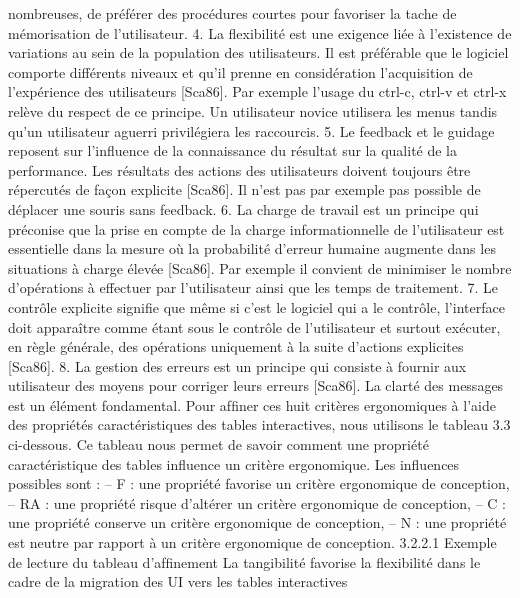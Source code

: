 \documentclass{article}
\begin{document}
nombreuses, de pr\'{e}f\'{e}rer des proc\'{e}dures courtes pour favoriser la tache de m\'{e}morisation de
l’utilisateur.
4. La ﬂexibilit\'{e} est une exigence li\'{e}e \`{a} l’existence de variations au sein de la population des utilisateurs. Il est pr\'{e}f\'{e}rable que le logiciel comporte diff\'{e}rents niveaux et qu’il prenne en consid\'{e}ration l’acquisition de l’exp\'{e}rience des utilisateurs [Sca86]. Par exemple l’usage du ctrl-c,
ctrl-v et ctrl-x rel\`{e}ve du respect de ce principe. Un utilisateur novice utilisera les menus tandis
qu’un utilisateur aguerri privil\'{e}giera les raccourcis.
5. Le feedback et le guidage reposent sur l’inﬂuence de la connaissance du r\'{e}sultat sur la qualit\'{e}
de la performance. Les r\'{e}sultats des actions des utilisateurs doivent toujours \^{e}tre r\'{e}percut\'{e}s
de fa\c{c}on explicite [Sca86]. Il n’est pas par exemple pas possible de d\'{e}placer une souris sans
feedback.
6. La charge de travail est un principe qui pr\'{e}conise que la prise en compte de la charge informationnelle de l’utilisateur est essentielle dans la mesure o\`{u} la probabilit\'{e} d’erreur humaine
augmente dans les situations \`{a} charge \'{e}lev\'{e}e [Sca86]. Par exemple il convient de minimiser le
nombre d’op\'{e}rations \`{a} effectuer par l’utilisateur ainsi que les temps de traitement.
7. Le contr\^{o}le explicite signiﬁe que m\^{e}me si c’est le logiciel qui a le contr\^{o}le, l’interface doit
appara\^{i}tre comme \'{e}tant sous le contr\^{o}le de l’utilisateur et surtout ex\'{e}cuter, en r\`{e}gle g\'{e}n\'{e}rale,
des op\'{e}rations uniquement \`{a} la suite d’actions explicites [Sca86].
8. La gestion des erreurs est un principe qui consiste \`{a} fournir aux utilisateur des moyens pour
corriger leurs erreurs [Sca86]. La clart\'{e} des messages est un \'{e}l\'{e}ment fondamental.
Pour afﬁner ces huit crit\`{e}res ergonomiques \`{a} l’aide des propri\'{e}t\'{e}s caract\'{e}ristiques des tables interactives, nous utilisons le tableau 3.3 ci-dessous. Ce tableau nous permet de savoir comment une
propri\'{e}t\'{e} caract\'{e}ristique des tables inﬂuence un crit\`{e}re ergonomique. Les inﬂuences possibles sont :
– F : une propri\'{e}t\'{e} favorise un crit\`{e}re ergonomique de conception,
– RA : une propri\'{e}t\'{e} risque d’alt\'{e}rer un crit\`{e}re ergonomique de conception,
– C : une propri\'{e}t\'{e} conserve un crit\`{e}re ergonomique de conception,
– N : une propri\'{e}t\'{e} est neutre par rapport \`{a} un crit\`{e}re ergonomique de conception.
3.2.2.1
Exemple de lecture du tableau d’afﬁnement
La tangibilit\'{e} favorise la ﬂexibilit\'{e} dans le cadre de la migration des UI vers les tables interactives
\end{document}
